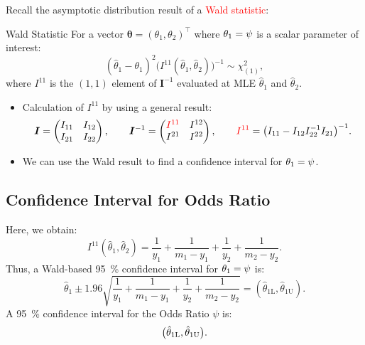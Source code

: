 \documentclass{article}\usepackage[]{graphicx}\usepackage[svgnames]{xcolor}
\let\exp\relax%
\let\log\relax%
\providecommand{\Vector}[1]{\bm{#1}}%
\providecommand{\Matrix}[1]{\bm{#1}}
\begin{document}
Recall the asymptotic distribution result of a \textcolor{Red}{Wald statistic}:
\begin{Regular}{Wald Statistic}
    For a vector $ \Vector{\theta}=(\theta_1,\theta_2)^\top $ where $ \theta_1=\log{\psi} $ is a scalar parameter of interest:
    \[ (\hat{\theta}_1-\theta_1)^2\bigl(I^{11}(\hat{\theta}_1,\hat{\theta}_2)\bigr)^{-1}\sim \chi^2_{(1)}, \]
    where $ I^{11} $ is the $ (1,1) $ element of $ \Matrix{I}^{-1} $ evaluated at MLE $ \hat{\theta}_1 $ and $ \hat{\theta}_2 $.
\end{Regular}
\begin{itemize}
    \item Calculation of $ I^{11} $ by using a general result:
          \[ \Matrix{I}=\begin{pmatrix}
                  I_{11} & I_{12} \\
                  I_{21} & I_{22}
              \end{pmatrix},\qquad \Matrix{I}^{-1}=\begin{pmatrix}
                  \textcolor{Red}{I^{11}} & I^{12} \\
                  I^{21}                  & I^{22}
              \end{pmatrix},\qquad \textcolor{Red}{I^{11}}=\bigl(I_{11}-I_{12}I_{22}^{-1}I_{21}\bigr)^{-1}. \]
    \item We can use the Wald result to find a confidence interval for $ \theta_1=\log{\psi} $.
\end{itemize}
\subsection*{Confidence Interval for Odds Ratio}
Here, we obtain:
\[ I^{11}(\hat{\theta}_1,\hat{\theta}_2)=\frac{1}{y_1} +\frac{1}{m_1-y_1}+\frac{1}{y_2}+\frac{1}{m_2-y_2}. \]
Thus, a Wald-based \qty{95}{\percent} confidence interval for $ \theta_1=\log{\psi} $ is:
\[ \hat{\theta}_1\pm 1.96\sqrt{\frac{1}{y_1} +\frac{1}{m_1-y_1} +\frac{1}{y_2} +\frac{1}{m_2-y_2}}=(\hat{\theta}_{1\text{L}},\hat{\theta}_{1\text{U}}). \]
A \qty{95}{\percent} confidence interval for the Odds Ratio $ \psi $ is:
\[ \bigl(\exp{\hat{\theta}_{1\text{L}}},\exp{\hat{\theta}_{1\text{U}}}\bigr). \]
\end{document}
